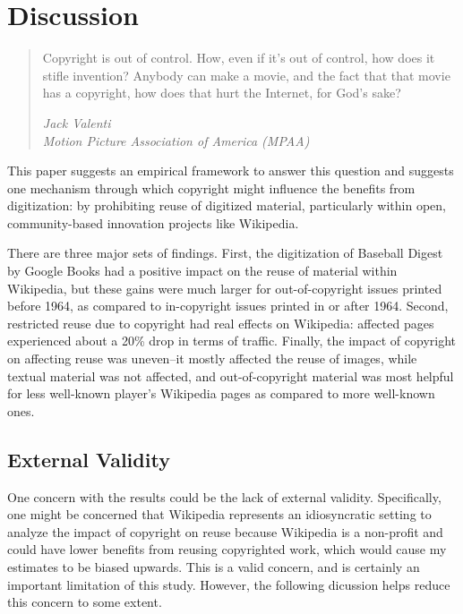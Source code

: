 \documentclass[11pt]{article}
\begin{document}
\section{Discussion}
\label{sec:discussion}

\begin{quote}
Copyright is out of control. How, even if it's out of control, how does it stifle invention? Anybody can make a movie, and the fact that that movie has a copyright, how does that hurt the Internet, for God's sake?
\begin{flushright} \emph{Jack Valenti}\\
\emph{Motion Picture Association of America (MPAA)}
\end{flushright}
\end{quote}

This paper suggests an empirical framework to answer this question and suggests one mechanism through which copyright might influence the benefits from digitization: by prohibiting reuse of digitized material, particularly within open, community-based innovation projects like Wikipedia. 

There are three major sets of findings. First, the digitization of Baseball Digest by Google Books had a positive impact on the reuse of material within Wikipedia, but these gains were much larger for out-of-copyright issues printed before 1964, as compared to in-copyright issues printed in or after 1964. Second, restricted reuse due to copyright had real effects on Wikipedia: affected pages experienced about a 20\% drop in terms of traffic. Finally, the impact of copyright on affecting reuse was uneven--it mostly affected the reuse of images, while textual material was not affected, and out-of-copyright material was most helpful for less well-known player's Wikipedia pages as compared to more well-known ones. 

\subsection{External Validity}

One concern with the results could be the lack of external validity. Specifically, one might be concerned that Wikipedia represents an idiosyncratic setting to analyze the impact of copyright on reuse because Wikipedia is a non-profit and could have lower benefits from reusing copyrighted work, which would cause my estimates to be biased upwards. This is a valid concern, and is certainly an important limitation of this study. However, the following dicussion helps reduce this concern to some extent. 
\end{document}
